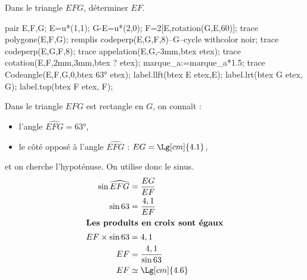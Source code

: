 \begin{methode}
    \exercice
    Dans le triangle $EFG$, déterminer $EF$.\\
    \begin{Geometrie}[CoinHD={(4u,5u)}]        
        pair E,F,G;
        E=u*(1,1);
        G-E=u*(2,0);
        F=2[E,rotation(G,E,60)];
        trace polygone(E,F,G);
        remplis codeperp(E,G,F,8)--G--cycle withcolor noir;
        trace codeperp(E,G,F,8);
        trace appelation(E,G,-3mm,btex  etex);        
        trace cotation(E,F,2mm,3mm,btex ? etex);
        marque_a:=marque_a*1.5;
        trace Codeangle(E,F,G,0,btex \ang{63} etex);
        label.llft(btex E etex,E);
        label.lrt(btex G etex, G);
        label.top(btex F etex, F);
    \end{Geometrie}
    \correction
    Dans le triangle $EFG$ est rectangle en $G$, on connaît :
    \begin{itemize}        
        \item l'angle $\widehat{EFG}=\ang{63}$,        
        \item le côté opposé à l'angle $\widehat{EFG}$ : $EG=\Lg[cm]{4.1}$,
    \end{itemize}
    et on cherche l'hypoténuse. On utilise donc le sinus.
    \begin{align*}
        \sin\widehat{EFG}&=\frac{EG}{EF}\\
        \sin63&=\frac{4,1}{EF}\\
        \intertext{\centering\bf Les produits en croix sont égaux}
        EF\times\sin63&=4,1\\
        EF&=\frac{4,1}{\sin63}\\
        EF&\simeq\Lg[cm]{4.6}
    \end{align*}
\end{methode}

